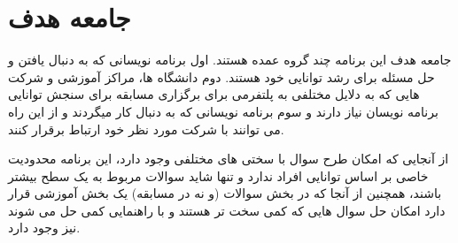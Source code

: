 \documentclass{article}
\begin{document}
	\section{جامعه هدف}
	جامعه هدف این برنامه چند گروه عمده هستند. اول برنامه نویسانی که به دنبال یافتن و حل مسئله برای رشد توانایی خود هستند. دوم دانشگاه ها، مراکز آموزشی و شرکت هایی که به دلایل مختلفی به پلتفرمی برای برگزاری مسابقه برای سنجش توانایی برنامه نویسان نیاز دارند و سوم برنامه نویسانی که به دنبال کار میگردند و از این راه می توانند با شرکت مورد نظر خود ارتباط برقرار کنند.
	
	از آنجایی که امکان طرح سوال با سختی های مختلفی وجود دارد، این برنامه محدودیت خاصی بر اساس توانایی افراد ندارد و تنها شاید سوالات مربوط به یک سطح بیشتر باشند، همچنین از آنجا که در بخش سوالات (و نه در مسابقه) یک بخش آموزشی قرار دارد امکان حل سوال هایی که کمی سخت تر هستند و با راهنمایی کمی حل می شوند نیز وجود دارد.
\end{document}
